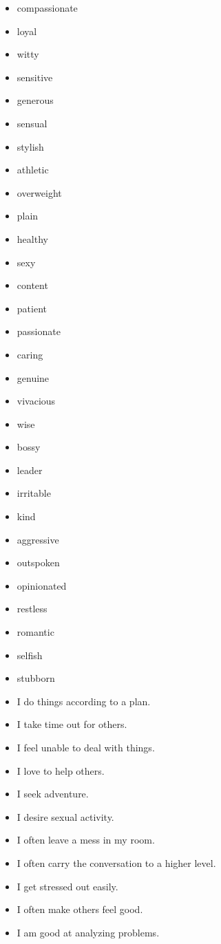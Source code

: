 \begin{appendices}
\begin{itemize}
\begin{enumerate}
\begin{itemize}
				\item compassionate
				\item loyal
				\item witty
				\item sensitive
				\item generous
				\item sensual
				\item stylish			
				\item athletic
				\item overweight
				\item plain
				\item healthy
				\item sexy
				\item content
				\item patient
				\item passionate
				\item caring
				\item genuine
				\item vivacious
				\item wise
				\item bossy
				\item leader
				\item irritable
				\item kind
				\item aggressive
				\item outspoken
				\item opinionated
				\item restless
				\item romantic
				\item selfish
				\item stubborn
				\item I do things according to a plan.
				\item I take time out for others.
				\item I feel unable to deal with things.
				\item I love to help others.
				\item I seek adventure.
				\item I desire sexual activity.
				\item I often leave a mess in my room.
				\item I often carry the conversation to a higher level.
				\item I get stressed out easily.
				\item I often make others feel good.
				\item I am good at analyzing problems.

\end{itemize}
\end{enumerate}
\end{itemize}
\end{appendices}
